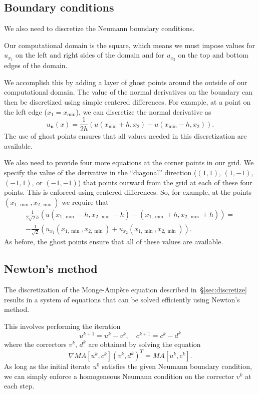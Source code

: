 \documentclass{amsart}
\theoremstyle{lemma}
\theoremstyle{remark}
\begin{document}
\subsection{Boundary conditions}\label{sec:discBC}
We also need to discretize the Neumann boundary conditions.

Our computational domain is the square, which means we must impose values for $u_{x_1}$ on the left and right sides of the domain and for $u_{x_2}$ on the top and bottom edges of the domain.

We accomplish this by adding a layer of ghost points around the outside of our computational domain.  The value of the normal derivatives on the boundary can then be discretized using simple centered differences.  For example, at a point on the left edge ($x_1=x_{\min}$), we can discretize the normal derivative as
\[ u_{\mathbf{n}}(x) = \frac{1}{2h}(u(x_{\min}+h,x_2)-u(x_{\min}-h,x_2)). \]
The use of ghost points ensures that all values needed in this discretization are available.

We also need to provide four more equations at the corner points in our grid.  We specify the value of the derivative in the ``diagonal'' direction ($(1,1)$, $(1,-1)$, $(-1,1)$, or $(-1,-1)$) that points outward from the grid at each of these four points.  This is enforced using centered differences.  So, for example, at the points $(x_{1,\min},x_{2,\min})$ we require that
\begin{multline*} \frac{1}{2\sqrt{2}h}(u(x_{1,\min}-h,x_{2,\min}-h) - (x_{1,\min}+h,x_{2,\min}+h)) =\\ -\frac{1}{\sqrt{2}}(u_{x_1}(x_{1,\min},x_{2,\min}) + u_{x_2}(x_{1,\min},x_{2,\min})). \end{multline*}
As before, the ghost points ensure that all of these values are available.

\subsection{Newton's method}\label{sec:newton}
The discretization of the {{Monge-Amp\`ere}\xspace} equation described in~\S\ref{sec:discretize} results in a system of equations that can be solved efficiently using Newton's method.

This involves performing the iteration
\[ u^{k+1} = u^k - v^k,\quad c^{k+1} = c^k - d^k \]
where the correctors $v^k$, $d^k$ are obtained by solving the equation
\[ \nabla MA[u^k,c^k](v^k,d^k)^T = MA[u^k,c^k]. \]
As long as the initial iterate $u^0$ satisfies the given Neumann boundary condition, we can simply enforce a homogeneous Neumann condition on the corrector $v^k$ at each step.
\end{document}
